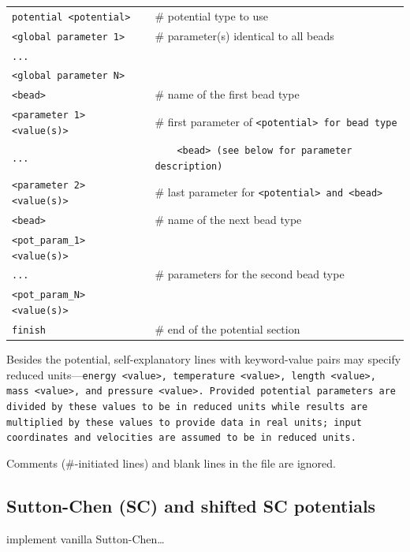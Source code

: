 \begin{longtable}{ll}
  \tt{potential <potential>}    & \# potential type to use\\
  \tt{<global parameter 1>}     & \# parameter(s) identical to all beads\\
  \tt{...}                      & \\
  \tt{<global parameter N>}     & \\
  \tt{<bead>}                   & \# name of the first bead type\\
  \tt{<parameter 1> <value(s)>} & \# first parameter of \tt{<potential>} for
                                  bead type\\
  \tt{...}                      & \ \ \ \ \tt{<bead>} (see below for parameter
                                  description)\\
  \tt{<parameter 2> <value(s)>} & \# last parameter for \tt{<potential>} and
                                  \tt{<bead>}\\
  \tt{<bead>}                   & \# name of the next bead type\\
  \tt{<pot_param_1> <value(s)>} & \\
  \tt{...}                      & \# parameters for the second bead type\\
  \tt{<pot_param_N> <value(s)>} & \\
  \tt{finish} & \# end of the potential section \\
\end{longtable}

Besides the potential, self-explanatory lines with keyword-value pairs may
specify reduced units---\tt{energy <value>}, \tt{temperature <value>},
\tt{length <value>}, \tt{mass <value>}, and \tt{pressure <value>}. Provided
potential parameters are divided by these values to be in reduced units while
results are multiplied by these values to provide data in real units; input
coordinates and velocities are assumed to be in reduced units.

Comments (\#-initiated lines) and blank lines in the file are ignored.

\subsection{Sutton-Chen (SC) and shifted SC potentials}
\TODO implement vanilla Sutton-Chen\ldots

